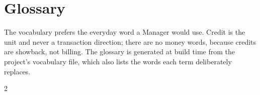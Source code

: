 \section{Glossary}\label{app:glossary}

The vocabulary prefers the everyday word a Manager would use. Credit is the unit and never a transaction direction; there are no money words, because credits are showback, not billing. The glossary is generated at build time from the project's vocabulary file, which also lists the words each term deliberately replaces.

\begin{multicols}{2}
\footnotesize

\end{multicols}
